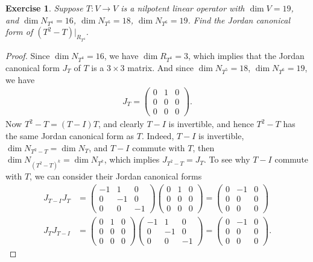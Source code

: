 \documentclass[11pt]{book}
\newtheorem{exercise}{Exercise}[section]
\theoremstyle{definition}
\numberwithin{equation}{chapter}
\begin{document}
\begin{exercise}
Suppose $T: V \to V$ is a nilpotent linear operator with $\dim V = 19$, and $\dim N_{T^4} = 16$, $\dim N_{T^5} = 18$, $\dim N_{T^6} = 19$. Find the Jordan canonical form of $(T^2 - T)|_{R_{T^4}}$.
\end{exercise}
\begin{proof}
Since $\dim N_{T^4} = 16$, we have $\dim R_{T^4} = 3$, which implies that the Jordan canonical form $J_T$ of $T$ is a $3 \times 3$ matrix. And since $\dim N_{T^5} = 18$, $\dim N_{T^6} = 19$, we have
\begin{align*}
    J_T = \begin{pmatrix}
        0 & 1 & 0 \\
        0 & 0 & 0 \\
        0 & 0 & 0 
    \end{pmatrix}.
\end{align*}
Now $T^2 - T = (T - I)T$, and clearly $T - I$ is invertible, and hence $T^2 - T$ has the same Jordan canonical form as $T$. Indeed, $T - I$ is invertible, $\dim N_{T^2-T} = \dim N_T$, and $T - I$ commute with $T$, then $\dim N_{(T^2-T)^k} = \dim N_{T^k}$, which implies $J_{T^2-T} = J_T$. To see why $T - I$ commute with $T$, we can consider their Jordan canonical forms
\begin{align*}
    J_{T-I} J_T & = \begin{pmatrix}
        -1 & 1 & 0 \\
        0 & -1 & 0 \\
        0 & 0 & -1 
    \end{pmatrix} \begin{pmatrix}
        0 & 1 & 0 \\
        0 & 0 & 0 \\
        0 & 0 & 0 
    \end{pmatrix} = \begin{pmatrix}
        0 & -1 & 0 \\
        0 & 0 & 0 \\
        0 & 0 & 0 
    \end{pmatrix} \\ 
    J_T J_{T-I} & = \begin{pmatrix}
        0 & 1 & 0 \\
        0 & 0 & 0 \\
        0 & 0 & 0 
    \end{pmatrix} \begin{pmatrix}
        -1 & 1 & 0 \\
        0 & -1 & 0 \\
        0 & 0 & -1 
    \end{pmatrix} = \begin{pmatrix}
        0 & -1 & 0 \\
        0 & 0 & 0 \\
        0 & 0 & 0 
    \end{pmatrix}.
\end{align*}
\end{proof}
\end{document}
